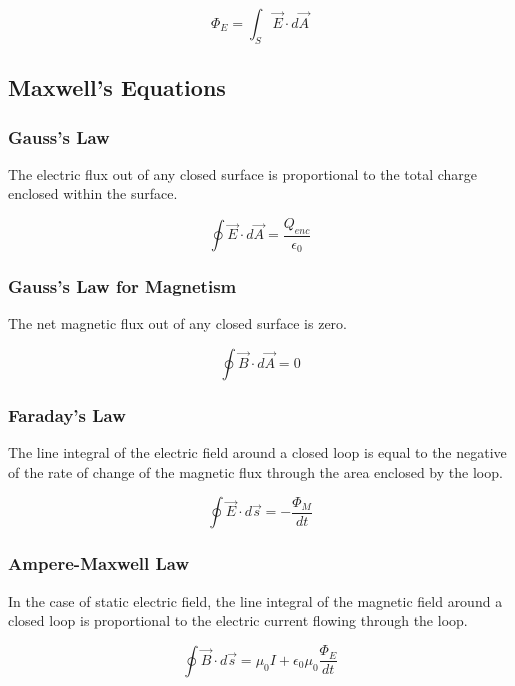 \documentclass[14pt]{memoir}
\begin{document}
\begin{equation}
\Phi_E = \int_S \vec{E} \cdot d\vec{A}
\end{equation}




\subsection{Maxwell's Equations}

\subsubsection{Gauss's Law}
The electric flux out of any closed surface is proportional to the total charge enclosed within the surface.

\begin{equation}
\oint \vec{E} \cdot d\vec{A} = \frac{Q_{enc}}{\epsilon_0} 
\end{equation}

\subsubsection{Gauss's Law for Magnetism}
The net magnetic flux out of any closed surface is zero.

\begin{equation}
\oint \vec{B} \cdot d\vec{A} = 0  
\end{equation}

\subsubsection{Faraday's Law}

The line integral of the electric field around a closed loop is equal to the negative of the rate of change of the magnetic flux through the area enclosed by the loop.

\begin{equation}
\oint \vec{E} \cdot d\vec{s} = -\frac{\Phi_{M}}{dt} 
\end{equation}

\subsubsection{Ampere-Maxwell Law}

In the case of static electric field, the line integral of the magnetic field around a closed loop is proportional to the electric current flowing through the loop.

\begin{equation}
\oint \vec{B} \cdot d\vec{s} = \mu_0 I + \epsilon_0 \mu_0 \frac{\Phi_{E}}{dt} 
\end{equation}
\end{document}
